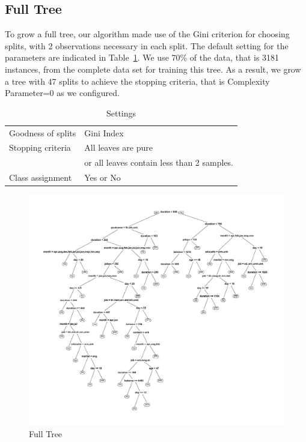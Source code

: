 \documentclass[letter]{article}
\begin{document}
\subsection{Full Tree}
To grow a full tree, our algorithm made use of the Gini criterion for
choosing splits, with 2 observations necessary in each split. The default
setting for the parameters are indicated in Table~\ref{setting}. We use 70\%
of the data, that is 3181 instances, from the complete data set for training
this tree. As a result, we grow a tree with 47 splits to achieve the stopping
criteria, that is Complexity Parameter=0 as we configured.

\begin{table}[!htbp]
\centering
\caption{Settings}\label{setting}
\begin{tabular}{ll}
\hline
\hline
Goodness of splits& Gini Index\\
Stopping criteria& All leaves are pure\\
&or all leaves contain less than 2 samples.\\
Class assignment& Yes or No\\
\hline
\hline
\end{tabular}
\end{table}

\begin{figure}[!tp]
\centering
\includegraphics[width=1\columnwidth]{fig/fulltree}
\caption{Full Tree}
\label{full}
\end{figure}  
\end{document}
